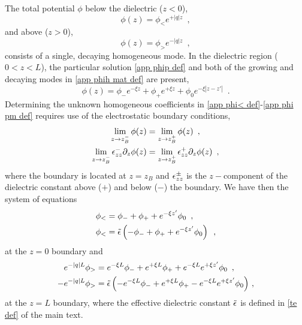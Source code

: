 The total potential $\phi$ below the dielectric ($z<0$),
\begin{equation}
    \label{app phi< def}
    \phi(z) = \phi_< e^{+|q|z}
    \,\,\,,
\end{equation}
and above ($z>0$),
\begin{equation}
    \label{app phi> def}
    \phi(z) = \phi_> e^{-|q|z}
    \,\,\,,
\end{equation}
consists of a single, decaying homogeneous mode.  In the dielectric region ($0<z<L$), the particular solution \eqref{app phip def} and both of the growing and decaying modes in \eqref{app phih mat def} are present,
\begin{equation}
    \label{app phi pm def}
    \phi(z) = \phi_- e^{-\xi z} + \phi_+ e^{+\xi z} + \phi_0 e^{-\xi|z-z'|}
    \,\,\,.
\end{equation}
Determining the unknown homogeneous coefficients in \eqref{app phi< def}-\eqref{app phi pm def} requires use of the electrostatic boundary conditions,
\begin{align}
    \label{app BC1 def}
    \lim_{z\to z_B^-}\phi(z) &= \lim_{z\to z_B^+}\phi(z)\,\,\,,
    \\ \label{app BC2 def}
    \lim_{z\to z_B^-}\epsilon_{zz}^-\partial_z\phi(z) &= \lim_{z\to z_B^+}\epsilon_{zz}^+\partial_z\phi(z)
    \,\,\,,
\end{align}
where the boundary is located at $z=z_B$ and $\epsilon_{zz}^{\pm}$ is the $z-$component of the dielectric constant above ($+$) and below ($-$) the boundary.  We have then the system of equations
\begin{align}
    \label{app z0 BC1}
    \phi_< &= 
    \phi_- + \phi_+ + e^{-\xi z'}\phi_0
    \,\,\,,
    \\
    \label{app z0 BC2}
    \phi_< &=
    \tilde{\epsilon}\left(
    -\phi_- + \phi_+ + e^{-\xi z'}\phi_0
    \right)
    \,\,\,,
\end{align}
at the $z=0$ boundary and
\begin{align}
    \label{app zL BC1}
    e^{-|q|L} \phi_>  &=
    e^{-\xi L} \phi_-  + e^{+\xi L} \phi_+ + e^{-\xi L}e^{+\xi z'} \phi_0
    \,\,\,,
    \\
    \label{app zL BC2}
    -e^{-|q|L}\phi_> 
    &=
    \tilde{\epsilon}\left(
    -e^{-\xi L} \phi_- + e^{+\xi L} \phi_+
    -
    e^{-\xi L} e^{+\xi z'} \phi_0 
    \right)
    \,,
\end{align}
at the $z=L$ boundary, where the effective dielectric constant $\tilde{\epsilon}$ is defined in \eqref{te def} of the main text.

